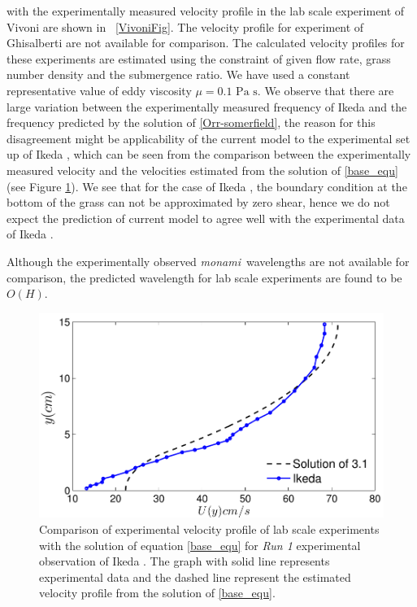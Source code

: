 \documentclass[12pt]{report}   %
\newcommand{\monami}{\textit{monami}}
\begin{document}
with the experimentally measured velocity profile in the lab scale experiment of Vivoni \cite{Vivoni98} are shown in ~\ref{VivoniFig}. The velocity profile for experiment of Ghisalberti \cite{Ghisal02} are not available for comparison. The calculated velocity profiles for these experiments are estimated using the constraint of given flow rate, grass number density and the submergence ratio. We have used a constant representative value of eddy viscosity $\mu =  \text{0.1 Pa s}$. We observe that there are large variation between the experimentally measured frequency of Ikeda \cite{Ikeda96} and the  frequency predicted by the solution of \ref{Orr-somerfield}, the reason for this disagreement might be applicability of the current model to the experimental set up of Ikeda \cite{Ikeda96}, which can be seen from the comparison between the experimentally measured velocity and the velocities estimated from the solution of \eqref{base_equ} (see Figure \ref{IkedaMatching}). We see that for the case of Ikeda \cite{Ikeda96}, the boundary 
condition at the 
bottom of the grass can not be approximated by zero shear, hence we do not expect the prediction of current model to agree well with the experimental data of Ikeda \cite{Ikeda96}.

Although the experimentally observed \monami ~wavelengths are not available for comparison, the predicted wavelength for lab scale experiments \citep{Ghisal02} are found to be $O(H)$.
\begin{figure}
 \includegraphics{Ikeda_zero_shear_match}
 \caption[ Comparison of experimental velocity profile of lab scale experiments with the solution of equation \eqref{base_equ} for \textit{Run 1 } experimental observation of Ikeda \cite{Ikeda96}. ] { Comparison of experimental velocity profile of lab scale experiments with the solution of equation \eqref{base_equ} for \textit{Run 1 } experimental observation of Ikeda \cite{Ikeda96}. The graph with solid line represents experimental data and the dashed line represent the estimated velocity profile from the solution of \eqref{base_equ}.    }
 \label{IkedaMatching}
\end{figure}
\end{document}
